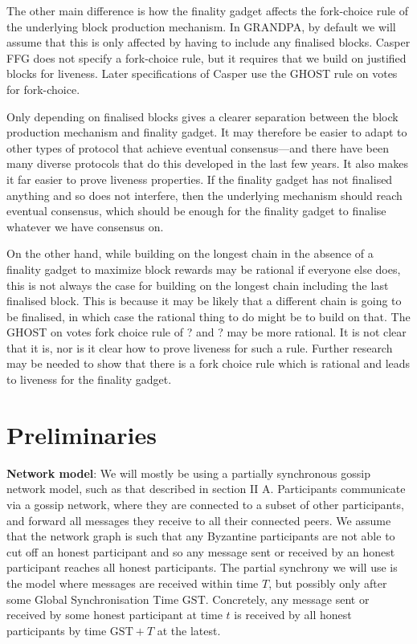 \documentclass{article}
\def\GST{\mathrm{GST}}
\begin{document}
The other main difference is how the finality gadget affects the fork-choice rule of the underlying block production mechanism. In GRANDPA, by default we will assume that this is only affected by having to include any finalised blocks. 
Casper FFG \cite{CasperFFG} does not specify a fork-choice rule, but it requires that we build on justified blocks for liveness. Later specifications of Casper use the GHOST rule on votes for fork-choice.

Only depending on finalised blocks gives a clearer separation between the block production mechanism and finality gadget. It may therefore be easier to adapt to other types of protocol that achieve eventual consensus—and there have been many diverse protocols that do this developed in the last few years.
It also makes it far easier to prove liveness properties.
If the finality gadget has not finalised anything and so does not interfere, then the underlying mechanism should reach eventual consensus, which should be enough for the finality gadget to finalise whatever we have consensus on.

On the other hand, while building on the longest chain in the absence of a finality gadget to maximize block rewards may be rational if everyone else does, this is not always the case for building on the longest chain including the last finalised block.
This is because it may be likely that a different chain is going to be finalised, in which case the rational thing to do might be to build on that. The GHOST on votes fork choice rule of ? and ? may be more rational.
It is not clear that it is, nor is it clear how to prove liveness for such a rule. Further research may be needed to show that there is a fork choice rule which is rational and leads to liveness for the finality gadget. 




\section{Preliminaries} \label{sec:prelims}

{\bf Network model}: We will mostly be using a partially synchronous gossip network model, such as that described in \cite{Tendermint} section II A.
Participants communicate via a gossip network, where they are connected to a subset of other participants, and forward all messages they receive to all their connected peers.
We assume that the network graph is such that any Byzantine participants are not able to cut off an honest participant and so any message sent or received by an honest participant reaches all honest participants.
The partial synchrony we will use is the model where messages are received within time $T$, but possibly only after some Global Synchronisation Time $\GST$.
Concretely, any message sent or received by some honest participant at time $t$ is received by all honest participants by time $\GST+T$ at the latest.
\end{document}
